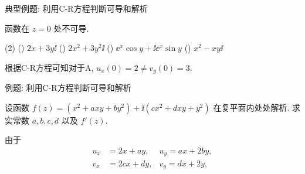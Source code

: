 \begin{frame}{典型例题: 利用C-R方程判断可导和解析}
	\onslide<+->
	\begin{exercise}[nearnext]
		函数在 $z=0$ 处不可导.
		\begin{exchoice}(2)
			() $2x+3y\ii$
			() $2x^2+3y^2\ii$
			() $\ee^x\cos y+\ii \ee^x\sin y$
			() $x^2-xy\ii$
		\end{exchoice}
	\end{exercise}
	\onslide<+->
	\begin{answer}[nearprev]
		根据C-R方程可知对于A, $u_x(0)=2\neq v_y(0)=3$.
		\onslide<+->{%
			C则是处处都可导.
		}
	\end{answer}
\end{frame}


\begin{frame}{例题: 利用C-R方程判断可导和解析}
	\onslide<+->
	\begin{example}[nearnext]
		设函数 $f(z)=(x^2+axy+by^2)+\ii(cx^2+dxy+y^2)$ 在复平面内处处解析. 求实常数 $a,b,c,d$ 以及 $f'(z)$.
	\end{example}
	\onslide<+->
	\begin{solution}[nearprev]
		由于
		\begin{align*}
			u_x&=2x+ay,&u_y=ax+2by,\\
			v_x&=2cx+dy,&v_y=dx+2y,
		\end{align*}
		\onslide<+->{%
			\[
				a=d=2,\quad b=c=-1,
			\]\bigdel
		}\onslide<+->{%
			\[
				f'(z)=u_x+\ii v_x=2x+2y+\ii(-2x+2y)=(2-2\ii)z.
			\]
		}\bigdel\smalldel
	\end{solution}
\end{frame}


